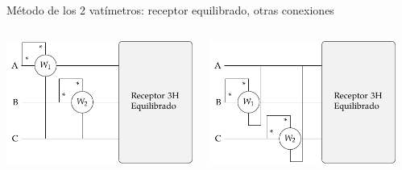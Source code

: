 \documentclass[aspectratio=169, usenames,svgnames,dvipsnames]{beamer}
\begin{document}
\begin{frame}{Método de los 2 vatímetros: \hspace{3mm}receptor equilibrado, \hspace{3mm}otras conexiones}
    \begin{columns}
    \begin{column}{0.33\columnwidth}
        \begin{center}
            \includegraphics[width=1\linewidth]{../figs/Potencia_3H_equilibrado_AB.pdf}
        \end{center}
    \end{column}
    \begin{column}{0.33\columnwidth}
        \begin{center}
            \includegraphics[width=1\linewidth]{../figs/Potencia_3H_equilibrado_BC.pdf}
        \end{center}
    \end{column}    
    \begin{column}{0.33\columnwidth}
        \begin{center}

\end{center}
\end{column}
\end{columns}
\end{frame}
\end{document}
